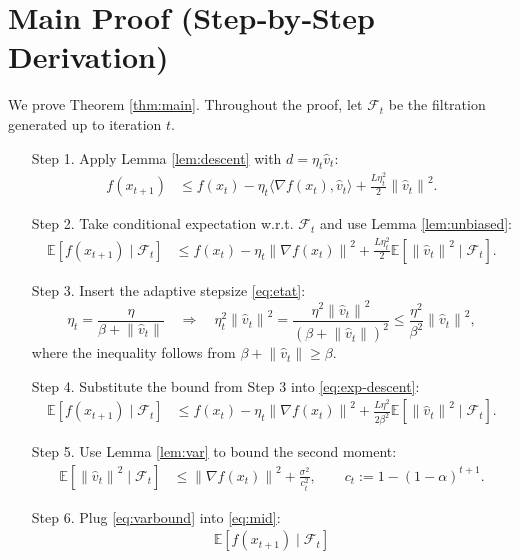 \documentclass{article}
\newcommand{\E}{\mathbb{E}}
\newcommand{\norm}[1]{\left\lVert#1\right\rVert}
\begin{document}
\section*{Main Proof (Step‑by‑Step Derivation)}
We prove Theorem \ref{thm:main}. Throughout the proof, let $\mathcal{F}_t$ be the filtration generated up to iteration $t$.

\begin{enumerate}
\item[Step 1.] Apply Lemma \ref{lem:descent} with $d=\eta_t\hat v_t$:
\begin{align}
f(x_{t+1}) &\le f(x_t)-\eta_t\langle\nabla f(x_t),\hat v_t\rangle
            +\frac{L\eta_t^{2}}{2}\norm{\hat v_t}^{2}. \label{eq:descent}
\end{align}
\item[Step 2.] Take conditional expectation w.r.t. $\mathcal{F}_t$ and use Lemma \ref{lem:unbiased}:
\begin{align}
\E\!\left[f(x_{t+1})\mid\mathcal{F}_t\right]
&\le f(x_t)-\eta_t\norm{\nabla f(x_t)}^{2}
   +\frac{L\eta_t^{2}}{2}\E\!\left[\norm{\hat v_t}^{2}\mid\mathcal{F}_t\right]. \label{eq:exp-descent}
\end{align}
\item[Step 3.] Insert the adaptive stepsize \eqref{eq:etat}:
\[
\eta_t=\frac{\eta}{\beta+\norm{\hat v_t}}\quad\Longrightarrow\quad
\eta_t^{2}\norm{\hat v_t}^{2}= \frac{\eta^{2}\norm{\hat v_t}^{2}}{(\beta+\norm{\hat v_t})^{2}}
\le \frac{\eta^{2}}{\beta^{2}}\norm{\hat v_t}^{2},
\]
where the inequality follows from $\beta+\norm{\hat v_t}\ge\beta$.
\item[Step 4.] Substitute the bound from Step 3 into \eqref{eq:exp-descent}:
\begin{align}
\E\!\left[f(x_{t+1})\mid\mathcal{F}_t\right]
&\le f(x_t)-\eta_t\norm{\nabla f(x_t)}^{2}
   +\frac{L\eta^{2}}{2\beta^{2}}
     \E\!\left[\norm{\hat v_t}^{2}\mid\mathcal{F}_t\right]. \label{eq:mid}
\end{align}
\item[Step 5.] Use Lemma \ref{lem:var} to bound the second moment:
\begin{align}
\E\!\left[\norm{\hat v_t}^{2}\mid\mathcal{F}_t\right]
&\le \norm{\nabla f(x_t)}^{2}
   +\frac{\sigma^{2}}{c_t^{2}},\qquad
c_t:=1-(1-\alpha)^{t+1}. \label{eq:varbound}
\end{align}
\item[Step 6.] Plug \eqref{eq:varbound} into \eqref{eq:mid}:
\begin{align}
\E\!\left[f(x_{t+1})\mid\mathcal{F}_t\right]

\end{align}
\end{enumerate}
\end{document}
